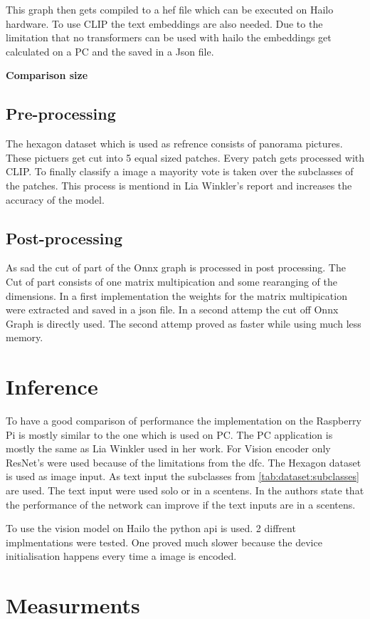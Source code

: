 This graph then gets compiled to a \acrshort{hef} file which can be executed on Hailo hardware.
To use CLIP the text embeddings are also needed.
Due to the limitation that no transformers can be used with hailo the embeddings get calculated on a PC and the saved in a Json file.

\textbf{Comparison size}


\subsection{Pre-processing}

The hexagon dataset which is used as refrence consists of panorama pictures.
These pictuers get cut into 5 equal sized patches.
Every patch gets processed with CLIP.
To finally classify a image a mayority vote is taken over the subclasses of the patches.
This process is mentiond in Lia Winkler's report and increases the accuracy of the model.

\subsection{Post-processing}

As sad the cut of part of the Onnx graph is processed in post processing.
The Cut of part consists of one matrix multipication and some rearanging of the dimensions.
In a first implementation the weights for the matrix multipication were extracted and saved in a json file.
In a second attemp the cut off Onnx Graph is directly used.
The second attemp proved as faster while using much less memory.

\section{Inference}
To have a good comparison of performance the implementation on the Raspberry Pi is mostly similar to the one which is used on PC.
The PC application is mostly the same as Lia Winkler used in her work.
For Vision encoder only ResNet's were used because of the limitations from the \acrshort{dfc}.
The Hexagon dataset is used as image input.
As text input the subclasses from \cref{tab:dataset:subclasses} are used.
The text input were used solo or in a scentens.
In \cite{clip} the authors state that the performance of the network can improve if the text inputs are in a scentens.

To use the vision model on Hailo the python api is used.
2 diffrent implmentations were tested.
One proved much slower because the device initialisation happens every time a image is encoded.



\section{Measurments}
